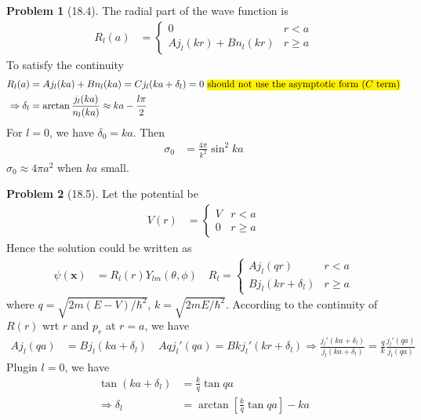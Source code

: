 \documentclass[twoside,11pt]{article}
\theoremstyle{definition}
\newtheorem{problem}{Problem}
\theoremstyle{remark}
\begin{document}
\begin{problem}[18.4]
The radial part of the wave function is
\begin{align*}
    R_l(a) &= \begin{cases}
        0 & r < a\\
        Aj_l(kr) + Bn_l(kr) & r \geq a
    \end{cases}
\end{align*}
To satisfy the continuity
\begin{align*}
    R_l(a) &= A j_l(ka) + B n_l(ka) = C j_l(ka+\delta_l) = 0\text{ \hl{should not use the asymptotic form ($C$ term)}}\\
    \Rightarrow
    \delta_l &= \arctan \frac{j_l(ka)}{n_l(ka)} \approx
    ka - \frac{l\pi}{2}
\end{align*}
For $l=0$, we have $\delta_0=ka$.
Then 
\begin{align*}
    \sigma_0 &= \frac{4\pi}{k^2}\sin^2 ka
\end{align*}
$\sigma_0\approx 4\pi a^2$ when $ka$ small.
\end{problem}



\begin{problem}[18.5]
Let the potential be
\begin{align*}
    V(r) &= \begin{cases}
        V & r < a\\
        0 & r\geq a
    \end{cases}
\end{align*}
Hence the solution could be written as
\begin{align*}
    \psi(\mathbf{x}) &= R_l(r)Y_{lm}(\theta,\phi)\quad
    R_l = \begin{cases}
        Aj_l(qr) & r < a\\
        Bj_l(kr+\delta_l) & r \geq a
    \end{cases}
\end{align*}
where $q=\sqrt{2m(E-V)/\hbar^2}$, $k=\sqrt{2mE/\hbar^2}$.
According to the continuity of $R(r)$ wrt $r$ and $p_r$ at $r=a$, we have
\begin{align*}
    Aj_l(qa) &= Bj_l(ka+\delta_l)\quad 
    Aqj_l'(qa) = Bkj_l'(kr+\delta_l)
    \Rightarrow
    \frac{j_l'(ka+\delta_l)}{j_l(ka+\delta_l)} = 
    \frac{q}{k}\frac{j_l'(qa)}{j_l(qa)}
\end{align*}
Plugin $l=0$, we have
\begin{align*}
    \tan(ka+\delta_l) &= \frac{k}{q}\tan qa\\
    \Rightarrow \delta_l &= 
    \arctan\left[
        \frac{k}{q}\tan qa
    \right] - ka
\end{align*}

\end{problem}





\end{document}
